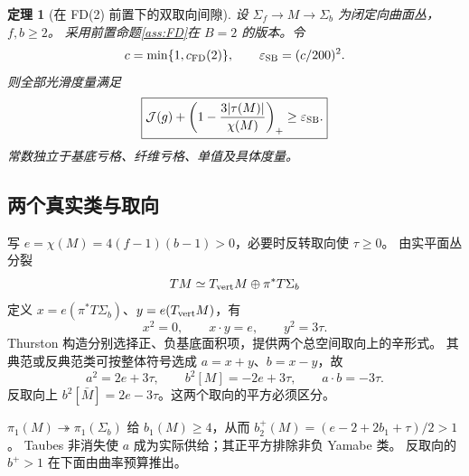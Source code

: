 \documentclass[UTF8,11pt,a4paper,fontset=none]{ctexart}
\numberwithin{equation}{section}
\newtheorem{theorem}{定理}[section]
\theoremstyle{definition}
\theoremstyle{remark}\newtheorem{remark}[theorem]{说明}
\newcommand{\Jcal}{\mathcal J}
\begin{document}
\begin{theorem}[在 FD(2) 前置下的双取向间隙]\label{thm:SB}
设 $\Sigma_f\to M\to\Sigma_b$ 为闭定向曲面丛，$f,b\ge2$。
采用前置命题\ref{ass:FD}在 $B=2$ 的版本。令
\[
c=\min\{1,c_{\rm FD}(2)\},\qquad \varepsilon_{\rm SB}=(c/200)^2.
\]
则全部光滑度量满足
\begin{equation}\label{eq:SB}
\boxed{\Jcal(g)+\left(1-\frac{3|\tau(M)|}{\chi(M)}\right)_+
\ge\varepsilon_{\rm SB}.}
\end{equation}
常数独立于基底亏格、纤维亏格、单值及具体度量。
\end{theorem}

\subsection{两个真实类与取向}
写 $e=\chi(M)=4(f-1)(b-1)>0$，必要时反转取向使 $\tau\ge0$。
由实平面丛分裂
\[
TM\simeq T_{\rm vert}M\oplus\pi^*T\Sigma_b
\]
定义 $x=e(\pi^*T\Sigma_b)$、$y=e(T_{\rm vert}M)$，有
\begin{equation}\label{eq:xy}
x^2=0,\qquad x\cdot y=e,\qquad y^2=3\tau.
\end{equation}
Thurston 构造分别选择正、负基底面积项，提供两个总空间取向上的辛形式。
其典范或反典范类可按整体符号选成 $a=x+y$、$b=x-y$\cite{Thurston,LeBrunKodaira}，故
\begin{equation}\label{eq:ab}
a^2=2e+3\tau,\qquad b^2[M]=-2e+3\tau,
\qquad a\cdot b=-3\tau.
\end{equation}
反取向上 $b^2[\bar M]=2e-3\tau$。这两个取向的平方必须区分。

$\pi_1(M)\twoheadrightarrow\pi_1(\Sigma_b)$ 给 $b_1(M)\ge4$，从而
$b_2^+(M)=(e-2+2b_1+\tau)/2>1$。
Taubes 非消失使 $a$ 成为实际供给\cite{Taubes}；其正平方排除非负 Yamabe 类。
反取向的 $b^+>1$ 在下面由曲率预算推出。
\end{document}
